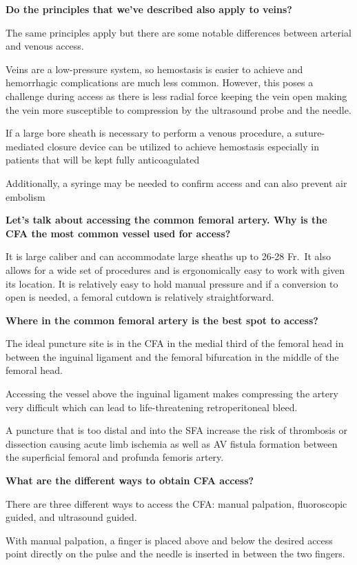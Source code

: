 \documentclass[
]{book}
\begin{document}
\textbf{Do the principles that we've described also apply to veins?}

The same principles apply but there are some notable differences between
arterial and venous access.

Veins are a low-pressure system, so hemostasis is easier to achieve and
hemorrhagic complications are much less common. However, this poses a
challenge during access as there is less radial force keeping the vein
open making the vein more susceptible to compression by the ultrasound
probe and the needle.

If a large bore sheath is necessary to perform a venous procedure, a
suture-mediated closure device can be utilized to achieve hemostasis
especially in patients that will be kept fully anticoagulated

Additionally, a syringe may be needed to confirm access and can also
prevent air embolism

\textbf{Let's talk about accessing the common femoral artery. Why is the CFA
the most common vessel used for access?}

It is large caliber and can accommodate large sheaths up to 26-28 Fr.~It
also allows for a wide set of procedures and is ergonomically easy to
work with given its location. It is relatively easy to hold manual
pressure and if a conversion to open is needed, a femoral cutdown is
relatively straightforward.

\textbf{Where in the common femoral artery is the best spot to access?}

The ideal puncture site is in the CFA in the medial third of the femoral
head in between the inguinal ligament and the femoral bifurcation in the
middle of the femoral head.

Accessing the vessel above the inguinal ligament makes compressing the
artery very difficult which can lead to life-threatening retroperitoneal
bleed.

A puncture that is too distal and into the SFA increase the risk of
thrombosis or dissection causing acute limb ischemia as well as AV
fistula formation between the superficial femoral and profunda femoris
artery.

\textbf{What are the different ways to obtain CFA access?}

There are three different ways to access the CFA: manual palpation,
fluoroscopic guided, and ultrasound guided.

With manual palpation, a finger is placed above and below the desired
access point directly on the pulse and the needle is inserted in between
the two fingers.
\end{document}
